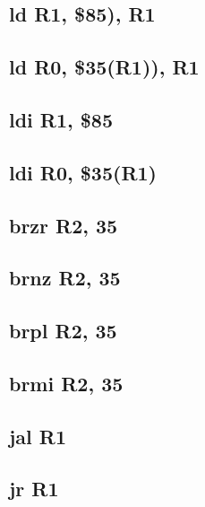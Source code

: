 \documentclass{article}
\begin{document}
    \subsection{ld R1, \$85), R1} \label{ld_case_1_sequence}
        
    \subsection{ld R0, \$35(R1)), R1} \label{ld_case_2_sequence}
        
    \subsection{ldi R1, \$85} \label{ldi_case_3_sequence}
        
    \subsection{ldi R0, \$35(R1)} \label{ldi_case_4_sequence}
        
    \subsection{brzr R2, 35} \label{brzr_sequence}
        
    \subsection{brnz R2, 35} \label{brnz_sequence}
        
    \subsection{brpl R2, 35} \label{brpl_sequence}
        
    \subsection{brmi R2, 35} \label{brmi_sequence}
        
    \subsection{jal R1} \label{jal_sequence}
        
    \subsection{jr R1} \label{jr_sequence}
        
\end{document}
